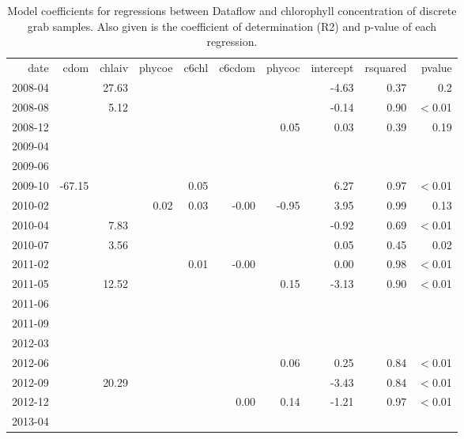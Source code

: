 \begin{table}
\caption{Model coefficients for regressions between Dataflow and chlorophyll concentration of discrete grab samples. Also given is the coefficient of determination (R2) and p-value of each regression.}
\label{tab:2}       %
\begin{tabular}{rrrrrrrrrr}
\hline\noalign{\smallskip}
date & cdom & chlaiv & phycoe & c6chl & c6cdom & phycoc & intercept & rsquared & pvalue \\ 
\noalign{\smallskip}\hline\noalign{\smallskip}
 2008-04 &  & 27.63 &  &  &  &  & -4.63 & 0.37 & 0.2 \\ 
  2008-08 &  & 5.12 &  &  &  &  & -0.14 & 0.90 & $<$0.01 \\ 
  2008-12 &  &  &  &  &  & 0.05 & 0.03 & 0.39 & 0.19 \\ 
  2009-04 &  &  &  &  &  &  &  &  &  \\ 
  2009-06 &  &  &  &  &  &  &  &  &  \\ 
  2009-10 & -67.15 &  &  & 0.05 &  &  & 6.27 & 0.97 & $<$0.01 \\ 
  2010-02 &  &  & 0.02 & 0.03 & -0.00 & -0.95 & 3.95 & 0.99 & 0.13 \\ 
  2010-04 &  & 7.83 &  &  &  &  & -0.92 & 0.69 & $<$0.01 \\ 
  2010-07 &  & 3.56 &  &  &  &  & 0.05 & 0.45 & 0.02 \\ 
  2011-02 &  &  &  & 0.01 & -0.00 &  & 0.00 & 0.98 & $<$0.01 \\ 
  2011-05 &  & 12.52 &  &  &  & 0.15 & -3.13 & 0.90 & $<$0.01 \\ 
  2011-06 &  &  &  &  &  &  &  &  &  \\ 
  2011-09 &  &  &  &  &  &  &  &  &  \\ 
  2012-03 &  &  &  &  &  &  &  &  &  \\ 
  2012-06 &  &  &  &  &  & 0.06 & 0.25 & 0.84 & $<$0.01 \\ 
  2012-09 &  & 20.29 &  &  &  &  & -3.43 & 0.84 & $<$0.01 \\ 
  2012-12 &  &  &  &  & 0.00 & 0.14 & -1.21 & 0.97 & $<$0.01 \\ 
  2013-04 &  &  &  &  &  &  &  &  &  \\ 

\end{tabular}
\end{table}
